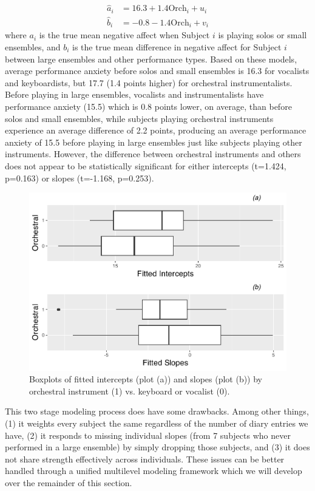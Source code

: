 \documentclass[
]{krantz}
\begin{document}
\begin{align}
\hat{a}_{i} & = 16.3+1.4\textrm{Orch}_{i}+u_{i}
\label{eq:level2s0hat}  \\
\hat{b}_{i} & = -0.8-1.4\textrm{Orch}_{i}+v_{i}
\nonumber
\end{align}
where \(a_{i}\) is the true mean negative affect when Subject \(i\) is playing solos or small ensembles, and \(b_{i}\) is the true mean difference in negative affect for Subject \(i\) between large ensembles and other performance types. Based on these models, average performance anxiety before solos and small ensembles is 16.3 for vocalists and keyboardists, but 17.7 (1.4 points higher) for orchestral instrumentalists. Before playing in large ensembles, vocalists and instrumentalists have performance anxiety (15.5) which is 0.8 points lower, on average, than before solos and small ensembles, while subjects playing orchestral instruments experience an average difference of 2.2 points, producing an average performance anxiety of 15.5 before playing in large ensembles just like subjects playing other instruments. However, the difference between orchestral instruments and others does not appear to be statistically significant for either intercepts (t=1.424, p=0.163) or slopes (t=-1.168, p=0.253).

\begin{figure}

{\centering \includegraphics[width=0.6\linewidth]{bookdown-BeyondMLR_files/figure-latex/mli-boxmat2-1} 

}

\caption{Boxplots of fitted intercepts (plot (a)) and slopes (plot (b)) by orchestral instrument (1) vs. keyboard or vocalist (0).}\label{fig:mli-boxmat2}
\end{figure}

This two stage modeling process does have some drawbacks. Among other things, (1) it weights every subject the same regardless of the number of diary entries we have, (2) it responds to missing individual slopes (from 7 subjects who never performed in a large ensemble) by simply dropping those subjects, and (3) it does not share strength effectively across individuals. These issues can be better handled through a unified multilevel modeling framework which we will develop over the remainder of this section.
\end{document}
